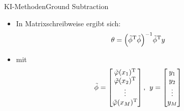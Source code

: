 \documentclass[169, handout	]{THIbeamer} %
\begin{document}
\begin{frame}{KI-Methoden}{Ground Subtraction}
	\begin{itemize}
		\item In Matrixschreibweise ergibt sich:			
		\begin{equation}
			\theta = \Bigl( \tilde{\phi}^{\text{T}} \tilde{\phi} \Bigr) ^{-1} \tilde{\phi}^{\text{T}} y
		\end{equation}
		\item[] mit
		\begin{equation}
			\tilde{\phi} =
			\begin{bmatrix}
				\tilde{\varphi} (x_1)^{\text{T}} \\
				\tilde{\varphi} (x_2)^{\text{T}} \\
				\vdots \\
				\tilde{\varphi} (x_M)^{\text{T}} \\			
			\end{bmatrix}
			\text{,}
			\hspace{0.2 cm}
			y = 
			\begin{bmatrix}
				y_1 \\
				y_2 \\
				\vdots \\
				y_M
			\end{bmatrix}
		\end{equation}
	\end{itemize}	

\end{frame}	
\end{document}
